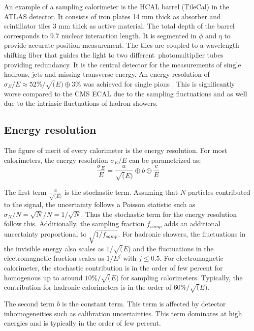 An example of a sampling calorimeter is the HCAL barrel (TileCal) in the ATLAS detector. It consists of iron plates 14 mm thick as absorber and scintillator tiles 3 mm thick as active material. The total depth of the barrel corresponds to 9.7 nuclear interaction length. It is segmented in $\phi$ and $\eta$ to provide accurate position measurement. The tiles are coupled to a wavelength shifting fiber that guides the light to two different photomultiplier tubes providing redundancy. It is the central detector for the measurements of single hadrons, jets and missing transverse energy. An energy resolution of $\sigma_E/E \approx 52\%/\sqrt(E) \oplus 3\%$ was achieved for single pions \cite{Henriques:2015fso}. This is significantly worse compared to the CMS ECAL due to the sampling fluctuations and as well due to the intrinsic fluctuations of hadron showers.

\subsection{Energy resolution}
\label{subsec:EnergyReso}

The figure of merit of every calorimeter is the energy resolution. For most calorimeters, the energy resolution $\sigma_E/E$ can be parametrized as:
\begin{equation} \label{eq:EnergyReso}
  \frac{\sigma_E}{E} = \frac{a}{\sqrt(E)} \oplus b \oplus \frac{c}{E}
\end{equation}

The first term $\frac{a}{\sqrt(E)}$ is the stochastic term. Assuming that $N$ particles contributed to the signal, the uncertainty follows a Poisson statistic such as $\sigma_N/N = \sqrt{N}/N = 1/\sqrt{N}$. Thus the stochastic term for the energy resolution follow this. Additionally, the sampling fraction $f_{samp}$ adds an additional uncertainty proportional to $\sqrt{1/f_{samp}}$. For hadronic showers, the fluctuations in the invisible energy also scales as $1/\sqrt(E)$ and the fluctuations in the electromagnetic fraction scales as $1/E^j$ with $j \leq 0.5$. For electromagnetic calorimeter, the stochastic contribution is in the order of few percent for homogenous up to around $10\%/\sqrt(E)$ for sampling calorimeters. Typically, the contribution for hadronic calorimeters is in the order of $60\%/\sqrt(E)$.

The second term $b$ is the constant term. This term is affected by detector inhomogeneities such as calibration uncertainties. This term dominates at high energies and is typically in the order of few percent.

